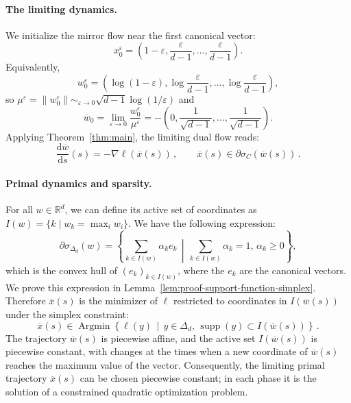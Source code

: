 \documentclass[11pt,english,reqno]{article}
\DeclareMathOperator{\Argmin}{Argmin}
\DeclareMathOperator{\supp}{supp}
\newcommand{\diff}{\mathrm{d}}
\newcommand{\R}{\mathbb{R}}
\renewcommand{\geq}{\geqslant}
\theoremstyle{plain}
\theoremstyle{definition}
\theoremstyle{remark}
\numberwithin{equation}{section}
\begin{document}
\paragraph{The limiting dynamics.} We initialize the mirror flow near the first canonical vector:
\[
	x_0^\varepsilon = \left(1-\varepsilon, \frac{\varepsilon}{d-1}, \ldots, \frac{\varepsilon}{d-1}\right).
\]
Equivalently,
\[
	w_0^\varepsilon =
	\left(\log(1-\varepsilon), \log\frac{\varepsilon}{d-1}, \ldots, \log\frac{\varepsilon}{d-1}\right),
\]
so $\mu^\varepsilon = \|w_0^\varepsilon\| \sim_{\varepsilon \to 0} \sqrt{d-1}\log(1/\varepsilon)$ and
\[
	\overline{w}_0
	= \lim_{\varepsilon \to 0} \frac{w_0^\varepsilon}{\mu^\varepsilon}
	= -\left(0, \frac{1}{\sqrt{d-1}}, \ldots, \frac{1}{\sqrt{d-1}}\right).
\]
Applying Theorem~\ref{thm:main}, the limiting dual flow reads:
%
\begin{equation*}
	\frac{\diff \overline{w}}{\diff s} (s) = - \nabla \ell(\overline{x}(s)) \, , \qquad \overline{x}(s) \mathrel{\in} \partial \sigma_C(\overline{w}(s)) \, .
\end{equation*}
%
\paragraph{Primal dynamics and sparsity.} For all $w \in \R^d$, we can define its active set of coordinates as $I(w) = \{k \mid w_k = \max_i w_i\}$. We have the following expression:
%
\begin{equation*}
	\partial \sigma_{\Delta_d}(w) = \left\{ \sum_{k \in I(w)} \alpha_k e_k \,\middle|\, \sum_{k \in I(w)} \alpha_k = 1,\, \alpha_k \geq 0 \right\} ,
\end{equation*}
%
which is the convex hull of $(e_k)_{k \in I(w)}$, where the $e_k$ are the canonical vectors. We prove this expression in Lemma~\ref{lem:proof-support-function-simplex}.
Therefore $\overline{x}(s)$ is the minimizer of $\ell$ restricted to coordinates in $I(\overline{w}(s))$ under the simplex constraint:
%
\begin{equation*}
	\overline{x}(s) \in \Argmin \left\{ \ell(y) \,\middle|\, y \in \Delta_d , \, \supp(y) \subset I(\overline{w}(s)) \right\} \, .
\end{equation*}
%
The trajectory $\overline{w}(s)$ is piecewise affine, and the active set $I(\overline{w}(s))$ is piecewise constant, with changes at the times when a new coordinate of $\overline{w}(s)$ reaches the maximum value of the vector. Consequently, the limiting primal trajectory $\overline{x}(s)$ can be chosen piecewise constant; in each phase it is the solution of a constrained quadratic optimization problem.
\end{document}
